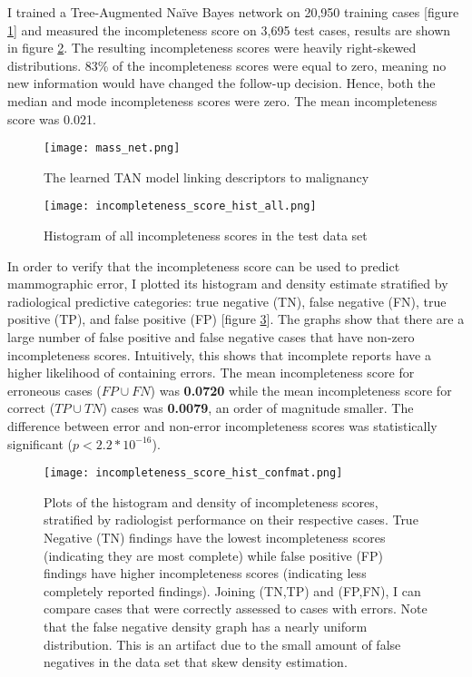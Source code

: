 I trained a Tree-Augmented Na\"{i}ve Bayes network on 20,950 training cases [figure \ref{fig:mass_net}] and measured the incompleteness score on 3,695 test cases, results are shown in figure \ref{fig:incompleteness_score_hist_all}. The resulting incompleteness scores were heavily right-skewed distributions. 83\% of the incompleteness scores were equal to zero, meaning no new information would have changed the follow-up decision. Hence, both the median and mode incompleteness scores were zero. The mean incompleteness score was 0.021.

\begin{figure}[h]
	\centering
	\texttt{[image: mass\_net.png]}
	\caption{The learned TAN model linking descriptors to malignancy}
	\label{fig:mass_net}
\end{figure}


\clearpage
\begin{figure}
\centering
\texttt{[image: incompleteness\_score\_hist\_all.png]}
\caption{Histogram of all incompleteness scores in the test data set}
\label{fig:incompleteness_score_hist_all}
\end{figure}


\clearpage
In order to verify that the incompleteness score can be used to predict mammographic error, I plotted its histogram and density estimate stratified by radiological predictive categories: true negative (TN), false negative (FN), true positive (TP), and false positive (FP) [figure \ref{fig:incompleteness_score_hist_confmat}]. The graphs show that there are a large number of false positive and false negative cases that have non-zero incompleteness scores. Intuitively, this shows that incomplete reports have a higher likelihood of containing errors. The mean incompleteness score for erroneous cases ($FP \cup FN$) was \textbf{0.0720} while the mean incompleteness score for correct ($TP \cup TN$) cases was \textbf{0.0079}, an order of magnitude smaller. The difference between error and non-error incompleteness scores was statistically significant ($p < 2.2*10^{-16}$).

\begin{figure}
\centering
\texttt{[image: incompleteness\_score\_hist\_confmat.png]}
\caption[Incompleteness scores stratified by confusion matrix]{Plots of the histogram and density of incompleteness scores, stratified by radiologist performance on their respective cases. True Negative (TN) findings have the lowest incompleteness scores (indicating they are most complete) while false positive (FP) findings have higher incompleteness scores (indicating less completely reported findings). Joining (TN,TP) and (FP,FN), I can compare cases that were correctly assessed to cases with errors. Note that the false negative density graph has a nearly uniform distribution. This is an artifact due to the small amount of false negatives in the data set that skew density estimation.}
\label{fig:incompleteness_score_hist_confmat}
\end{figure}


